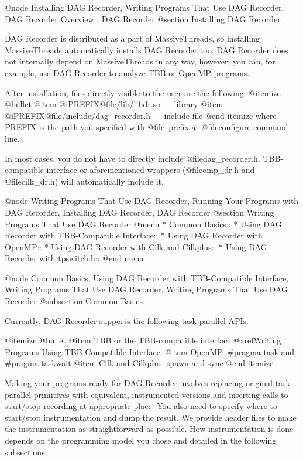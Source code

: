 @node Installing DAG Recorder, Writing Programs That Use DAG Recorder, DAG Recorder Overview , DAG Recorder
@section Installing DAG Recorder

DAG Recorder is distributed as a part of MassiveThreads, so installing
MassiveThreads automatically installs DAG Recorder too.  DAG Recorder
does not internally depend on MassiveThreads in any way, however; you
can, for example, use DAG Recorder to analyze TBB or OpenMP programs.  

After installation, files directly visible to the user are the following.
@itemize @bullet
@item @i{PREFIX}@file{/lib/libdr.so} --- library
@item @i{PREFIX}@file{/include/dag_recorder.h} --- include file
@end itemize
where PREFIX is the path you specified with @file{--prefix} at
@file{configure} command line.  

In most cases, you do not have to directly include
@file{dag_recorder.h}.  TBB-compatible interface or aforementioned
wrappers (@file{omp_dr.h} and @file{cilk_dr.h}) will automatically
include it.

@node Writing Programs That Use DAG Recorder, Running Your Programs with DAG Recorder, Installing DAG Recorder, DAG Recorder
@section Writing Programs That Use DAG Recorder
@menu
* Common Basics::
* Using DAG Recorder with TBB-Compatible Interface::
* Using DAG Recorder with OpenMP::
* Using DAG Recorder with Cilk and Cilkplus::
* Using DAG Recorder with tpswitch.h::
@end menu

@node Common Basics, Using DAG Recorder with TBB-Compatible Interface, Writing Programs That Use DAG Recorder, Writing Programs That Use DAG Recorder
@subsection Common Basics

Currently, DAG Recorder supports the following task parallel APIs.

@itemize @bullet
@item TBB or the TBB-compatible interface @xref{Writing Programs Using TBB-Compatible Interface}.
@item OpenMP. #pragma task and #pragma taskwait
@item Cilk and Cilkplus. spawn and sync
@end itemize

Making your programs ready for DAG Recorder involves replacing original
task parallel primitives with equivalent, instrumented versions and
inserting calls to start/stop recording at appropriate place.  You also
need to specify where to start/stop instrumentation and dump the result.
We provide header files to make the instrumentation as straightforward
as possible.  How instrumentation is done depends on the programming
model you chose and detailed in the following subsections.

